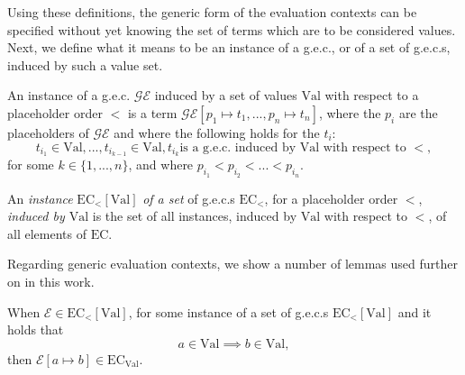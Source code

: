 Using these definitions, the generic form of the evaluation contexts can be specified without yet knowing the set of terms which are to be considered values. Next, we define what it means to be an instance of a g.e.c., or of a set of g.e.c.s, induced by such a value set.

\begin{definition}[Instance of a g.e.c.]
An instance of a g.e.c. $\mathcal{GE}$ induced by a set of values $\textrm{Val}$ with respect to  a placeholder order $<$ is a term $\mathcal{GE}[p_1 \mapsto t_1, ..., p_n \mapsto t_n]$, where the $p_i$ are the placeholders of $\mathcal{GE}$ and where the following holds for the $t_i$:
\[
t_{i_1} \in \textrm{Val}, ..., t_{i_{k-1}} \in \textrm{Val}, t_{i_k} \textrm{is a g.e.c. induced by Val with respect to } <,
\]
for some $k \in \{1, ..., n\}$, and where $p_{i_1} < p_{i_2} < ... < p_{i_n}$.
\end{definition}

\begin{definition}
An \textit{instance} $\textrm{EC}_<[\textrm{Val}]$ \textit{of a set} of g.e.c.s $\textrm{EC}_<$, for a placeholder order $<$, \textit{induced by $\textrm{Val}$} is the set of all instances, induced by $\textrm{Val}$ with respect to $<$, of all elements of $\textrm{EC}$.
\end{definition}

Regarding generic evaluation contexts, we show a number of lemmas used further on in this work.

\begin{lemma}
When $\mathcal{E} \in \textrm{EC}_<[{\textrm{Val}}]$, for some instance of a set of g.e.c.s $\textrm{EC}_<[\textrm{Val}]$ and it holds that
\[
a \in \textrm{Val} \implies b \in \textrm{Val},
\]
then $\mathcal{E}[a \mapsto b] \in \textrm{EC}_{\textrm{Val}}$.
\end{lemma}
